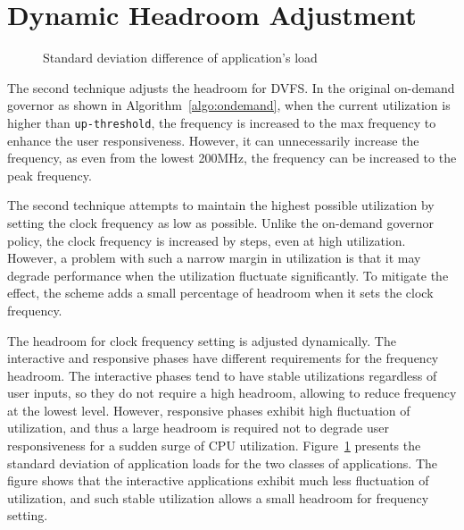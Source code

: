 

\section{Dynamic Headroom Adjustment}

\begin{figure}[bt]
\begin{center}
\vspace{-0.2in}
\end{center}
\caption{Standard deviation difference of application's load}
\label{fig:stdv_phase}
\end{figure}

The second technique adjusts the headroom for DVFS. In the original on-demand 
governor as shown in Algorithm~\ref{algo:ondemand}, when the current utilization is higher than
{\tt up-threshold}, the frequency is increased to the max frequency to enhance the user responsiveness.
However, it can unnecessarily increase the frequency, as even from the lowest 200MHz,
the frequency can be increased to the peak frequency.

The second technique attempts to maintain the highest possible utilization by
setting the clock frequency as low as possible. Unlike the on-demand governor 
policy, the clock frequency is increased by steps, even at high utilization.
However, a problem with such
a narrow margin in utilization is that it may degrade performance when the
utilization fluctuate significantly. To mitigate the effect, the scheme adds 
a small percentage of headroom when it sets the clock frequency.

The headroom for clock frequency setting is adjusted dynamically.
The interactive and responsive phases have different requirements for the 
frequency headroom. The interactive phases tend to have stable utilizations regardless
of user inputs, so they do not require a high headroom, allowing to reduce 
frequency at the lowest level. 
However, responsive phases exhibit high fluctuation of utilization,
and thus a large headroom is required not to degrade user responsiveness for a sudden surge
of CPU utilization. Figure~\ref{fig:stdv_phase} presents the standard deviation of
application loads for the two classes of applications. The figure shows that
the interactive applications exhibit much less fluctuation of utilization, and
such stable utilization allows a small headroom for frequency setting.

